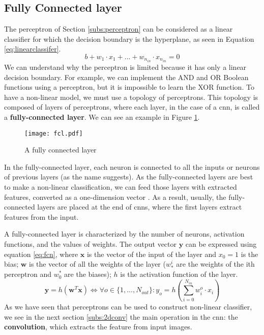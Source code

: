 \subsection{Fully Connected layer} \label{subs:fcl}
The perceptron of Section \ref{subs:perceptron} can be considered as a linear classifier for which the decision boundary is the hyperplane, as seen in Equation \eqref{eq:linearclassifer}.
%
\begin{equation}
    b + w_1 \cdot x_1 + ... + w_{n_{in}} \cdot x_{n_{in}} = 0
    \label{eq:linearclassifer}
\end{equation}
%
We can understand why the perceptron is limited because it has only a linear decision boundary. For example, we can implement the AND and OR Boolean functions using a perceptron, but it is impossible to learn the XOR function. To have a non-linear model, we must use a topology of perceptrons. This topology is composed of layers of perceptrons, where each layer, in the case of a \acrshort{cnn}, is called a \textbf{fully-connected layer}. We can see an example in Figure \ref{fig:fcn}.
%
\begin{figure}
    \centering
    \texttt{[image: fcl.pdf]}
    \caption{A fully connected layer}
    \label{fig:fcn}
\end{figure}

In the fully-connected layer, each neuron is connected to all the inputs or neurons of previous layers (as the name suggests). As the fully-connected layers are best to make a non-linear classification, we can feed those layers with extracted features, converted as a one-dimension vector \cite{khan_survey_2020}. As a result, usually, the fully-connected layers are placed at the end of \acrshort{cnn}s, where the first layers extract features from the input.

A fully-connected layer is characterized by the number of neurons, activation functions, and the values of weights. The output vector $\boldsymbol{y}$ can be expressed using equation \eqref{eq:fcn}, where $\boldsymbol{x}$ is the vector of the input of the layer and $x_0 = 1$ is the bias;   $\boldsymbol{w}$ is the vector of all the weights of the layer ($w^i_*$ are the weights of the ith perceptron and $w^*_0$ are the biases); $h$ is the activation function of the layer.
%
\begin{equation}
    \boldsymbol{y} = h(\boldsymbol{w}^T \boldsymbol{x}) \Leftrightarrow \forall o \in \{ 1, ..., N_{out} \} : y_o = h(\sum^{N_{in}}_{i=0} w^o_i \cdot x_i)
    \label{eq:fcn}
\end{equation}
%
As we have seen that perceptrons can be used to construct non-linear classifier, we see in the next section \ref{subs:2dconv} the main operation in the \acrshort{cnn}: the \textbf{convolution}, which extracts the feature from input images.
